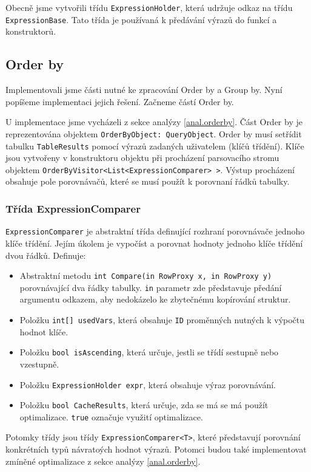 Obecně jsme vytvořili třídu \texttt{ExpressionHolder}, která udržuje odkaz na třídu \texttt{ExpressionBase}.
Tato třída je používaná k předávání výrazů do funkcí a konstruktorů.

\subsection{Order by}

Implementovali jsme části nutné ke zpracování Order by a Group by.
Nyní popíšeme implementaci jejich řešení.
Začneme částí Order by.

U implementace jsme vycházeli z sekce analýzy \ref{anal.orderby}.
Část Order by je reprezentována objektem \texttt{OrderByObject: QueryObject}.
Order by musí setřídit tabulku \texttt{TableResults} pomocí výrazů zadaných uživatelem (klíčů třídění).
Klíče jsou vytvořeny v konstruktoru objektu při procházení parsovacího stromu objektem \texttt{OrderByVisitor<List<ExpressionComparer> >}.
Výstup procházení obsahuje pole porovnávačů, které se musí použít k porovnaní řádků tabulky.

\subsubsection{Třída ExpressionComparer}

\texttt{ExpressionComparer} je abstraktní třída definující rozhraní porovnávače jednoho klíče třídění.
Jejím úkolem je vypočíst a porovnat hodnoty jednoho klíče třídění dvou řádků.
Definuje:
\begin{itemize}
\item Abstraktní metodu \texttt{int Compare(in RowProxy x, in RowProxy y)} porovnávající dva řádky tabulky.
\texttt{in} parametr zde představuje předání argumentu odkazem, aby nedokázelo ke zbytečnému kopírování struktur.
\item Položku \texttt{int[] usedVars}, která obsahuje \texttt{ID} proměnných nutných k výpočtu hodnot klíče.
\item Položku \texttt{bool isAscending}, která určuje, jestli se třídí sestupně nebo vzestupně.
\item Položku \texttt{ExpressionHolder expr}, která obsahuje výraz porovnávání.
\item Položku \texttt{bool CacheResults}, která určuje, zda se má se má použít optimalizace.
\texttt{true} označuje využití optimalizace.

\end{itemize}
Potomky třídy jsou třídy \texttt{ExpressionComparer<T>}, které představují porovnání konkrétních typů návratoých hodnot výrazů.
Potomci budou také implementovat zmíněné optimalizace z sekce analýzy \ref{anal.orderby}.


